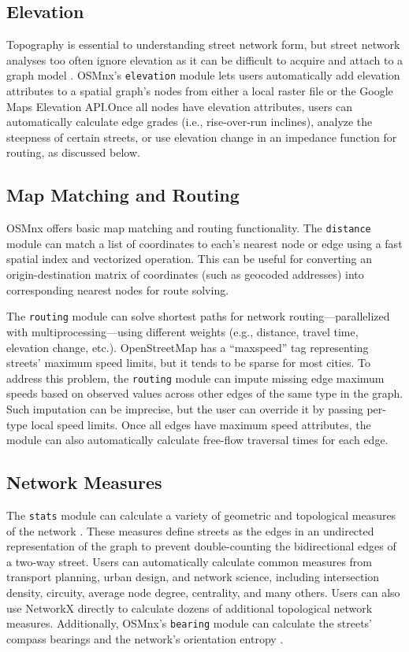 \documentclass[12pt,letterpaper]{article} %
\begin{document}
\subsection{Elevation}

Topography is essential to understanding street network form, but street network analyses too often ignore elevation as it can be difficult to acquire and attach to a graph model \citep{boeing_street_2022}. OSMnx's \texttt{elevation} module lets users automatically add elevation attributes to a spatial graph's nodes from either a local raster file or the Google Maps Elevation API.\@ Once all nodes have elevation attributes, users can automatically calculate edge grades (i.e., rise-over-run inclines), analyze the steepness of certain streets, or use elevation change in an impedance function for routing, as discussed below.

\subsection{Map Matching and Routing}

OSMnx offers basic map matching and routing functionality. The \texttt{distance} module can match a list of coordinates to each's nearest node or edge using a fast spatial index and vectorized operation. This can be useful for converting an origin-destination matrix of coordinates (such as geocoded addresses) into corresponding nearest nodes for route solving.

The \texttt{routing} module can solve shortest paths for network routing---parallelized with multiprocessing---using different weights (e.g., distance, travel time, elevation change, etc.). OpenStreetMap has a \enquote{maxspeed} tag representing streets' maximum speed limits, but it tends to be sparse for most cities. To address this problem, the \texttt{routing} module can impute missing edge maximum speeds based on observed values across other edges of the same type in the graph. Such imputation can be imprecise, but the user can override it by passing per-type local speed limits. Once all edges have maximum speed attributes, the module can also automatically calculate free-flow traversal times for each edge.

\subsection{Network Measures}

The \texttt{stats} module can calculate a variety of geometric and topological measures of the network \citep{boeing_street_2022}. These measures define streets as the edges in an undirected representation of the graph to prevent double-counting the bidirectional edges of a two-way street. Users can automatically calculate common measures from transport planning, urban design, and network science, including intersection density, circuity, average node degree, centrality, and many others. Users can also use NetworkX directly to calculate dozens of additional topological network measures. Additionally, OSMnx's \texttt{bearing} module can calculate the streets' compass bearings and the network's orientation entropy \citep{boeing_urban_2019}.
\end{document}
